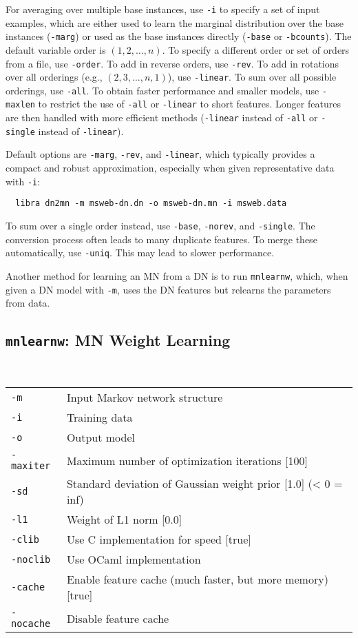 \documentclass[11pt]{article}
\begin{document}
For averaging over multiple base instances, use {\tt -i} to specify a
set of input examples, which are either used to learn the marginal
distribution over the base instances ({\tt -marg}) or used as the base
instances directly ({\tt -base} or {\tt -bcounts}).  The default
variable order is $(1, 2, \ldots, n)$.  To specify a different order
or set of orders from a file, use {\tt -order}.  To add in reverse
orders, use {\tt -rev}.  To add in rotations over all orderings (e.g.,
$(2, 3, \ldots, n, 1)$), use {\tt -linear}.  To sum over all possible
orderings, use {\tt -all}.  To obtain faster performance and smaller
models, use {\tt -maxlen} to restrict the use of {\tt -all} or
{\tt -linear} to short features.  Longer features are then handled
with more efficient methods ({\tt -linear} instead of {\tt -all} or
{\tt -single} instead of {\tt -linear}).

Default options are {\tt -marg}, {\tt -rev}, and {\tt -linear}, which
typically provides a compact and robust approximation, especially when
given representative data with {\tt -i}:
\begin{verbatim}
  libra dn2mn -m msweb-dn.dn -o msweb-dn.mn -i msweb.data
\end{verbatim}

To sum over a single order instead, use {\tt -base}, {\tt -norev}, and
{\tt -single}.  The conversion process often leads to many duplicate
features.  To merge these automatically, use {\tt -uniq}.  This may
lead to slower performance.

Another method for learning an MN from a DN is to run {\tt mnlearnw},
which, when given a DN model with {\tt -m}, uses the DN features but
relearns the parameters from data.

\subsection{{\tt mnlearnw}: MN Weight Learning} \label{sec:mnlearnw}

\noindent {} \\
\begin{tabular}{ll}
{\tt -m} &        Input Markov network structure \\
{\tt -i} &        Training data \\
{\tt -o} &        Output model \\
{\tt -maxiter} &  Maximum number of optimization iterations [100] \\
{\tt -sd} &       Standard deviation of Gaussian weight prior [1.0] (< 0 = inf) \\
{\tt -l1} &       Weight of L1 norm [0.0] \\
{\tt -clib} &     Use C implementation for speed [true]  \\
{\tt -noclib} &   Use OCaml implementation \\
{\tt -cache} &    Enable feature cache (much faster, but more memory) [true] \\
{\tt -nocache} &  Disable feature cache \\
\end{tabular} \\
\end{document}
